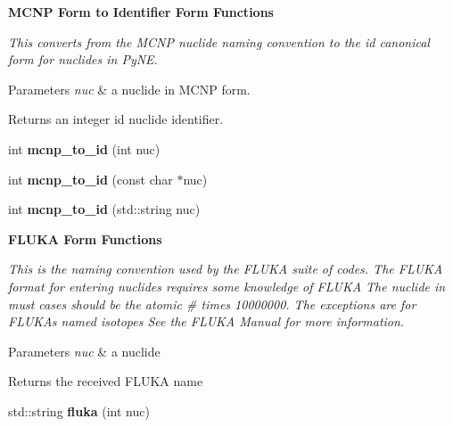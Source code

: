 \begin{Indent}{\bf M\+C\+NP Form to Identifier Form Functions}\par
{\em This converts from the M\+C\+NP nuclide naming convention to the id canonical form for nuclides in Py\+NE. 
\begin{DoxyParams}{Parameters}
{\em nuc} & a nuclide in M\+C\+NP form. \\
\hline
\end{DoxyParams}
\begin{DoxyReturn}{Returns}
an integer id nuclide identifier. 
\end{DoxyReturn}
}\begin{DoxyCompactItemize}
\item 
int {\bfseries mcnp\+\_\+to\+\_\+id} (int nuc)\hypertarget{namespacepyne_1_1nucname_a08a6a5c718cf9f473ec04fea4f3d8136}{}\label{namespacepyne_1_1nucname_a08a6a5c718cf9f473ec04fea4f3d8136}

\item 
int {\bfseries mcnp\+\_\+to\+\_\+id} (const char $\ast$nuc)\hypertarget{namespacepyne_1_1nucname_a6bf4ccafa2128186744f101f0c19fe62}{}\label{namespacepyne_1_1nucname_a6bf4ccafa2128186744f101f0c19fe62}

\item 
int {\bfseries mcnp\+\_\+to\+\_\+id} (std\+::string nuc)\hypertarget{namespacepyne_1_1nucname_a9dfc39f06bbb535cb9df3bc06a1211ff}{}\label{namespacepyne_1_1nucname_a9dfc39f06bbb535cb9df3bc06a1211ff}

\end{DoxyCompactItemize}
\end{Indent}
\begin{Indent}{\bf F\+L\+U\+KA Form Functions}\par
{\em This is the naming convention used by the F\+L\+U\+KA suite of codes. The F\+L\+U\+KA format for entering nuclides requires some knowledge of F\+L\+U\+KA The nuclide in must cases should be the atomic \# times 10000000. The exceptions are for F\+L\+U\+KA\textquotesingle{}s named isotopes See the F\+L\+U\+KA Manual for more information. 
\begin{DoxyParams}{Parameters}
{\em nuc} & a nuclide \\
\hline
\end{DoxyParams}
\begin{DoxyReturn}{Returns}
the received F\+L\+U\+KA name 
\end{DoxyReturn}
}\begin{DoxyCompactItemize}
\item 
std\+::string {\bfseries fluka} (int nuc)\hypertarget{namespacepyne_1_1nucname_ac34443f2c05ca8fda7d7993e715a3f5a}{}\label{namespacepyne_1_1nucname_ac34443f2c05ca8fda7d7993e715a3f5a}

\end{DoxyCompactItemize}
\end{Indent}
